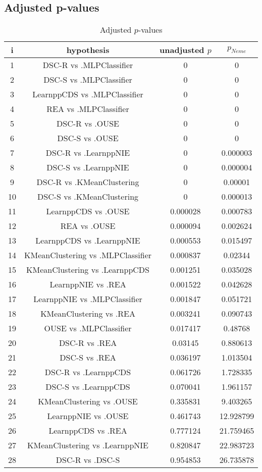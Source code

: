 \documentclass[a4paper,10pt]{article}
\begin{document}
\begin{landscape}
\pagebreak

\subsection{Adjusted p-values}

\begin{table}[!htp]
\centering\scriptsize
\begin{tabular}{cccc}
i&hypothesis&unadjusted $p$&$p_{Neme}$\\
\hline1&DSC-R vs .MLPClassifier&0&0\\
2&DSC-S vs .MLPClassifier&0&0\\
3&LearnppCDS vs .MLPClassifier&0&0\\
4&REA vs .MLPClassifier&0&0\\
5&DSC-R vs .OUSE&0&0\\
6&DSC-S vs .OUSE&0&0\\
7&DSC-R vs .LearnppNIE&0&0.000003\\
8&DSC-S vs .LearnppNIE&0&0.000004\\
9&DSC-R vs .KMeanClustering&0&0.00001\\
10&DSC-S vs .KMeanClustering&0&0.000013\\
11&LearnppCDS vs .OUSE&0.000028&0.000783\\
12&REA vs .OUSE&0.000094&0.002624\\
13&LearnppCDS vs .LearnppNIE&0.000553&0.015497\\
14&KMeanClustering vs .MLPClassifier&0.000837&0.02344\\
15&KMeanClustering vs .LearnppCDS&0.001251&0.035028\\
16&LearnppNIE vs .REA&0.001522&0.042628\\
17&LearnppNIE vs .MLPClassifier&0.001847&0.051721\\
18&KMeanClustering vs .REA&0.003241&0.090743\\
19&OUSE vs .MLPClassifier&0.017417&0.48768\\
20&DSC-R vs .REA&0.03145&0.880613\\
21&DSC-S vs .REA&0.036197&1.013504\\
22&DSC-R vs .LearnppCDS&0.061726&1.728335\\
23&DSC-S vs .LearnppCDS&0.070041&1.961157\\
24&KMeanClustering vs .OUSE&0.335831&9.403265\\
25&LearnppNIE vs .OUSE&0.461743&12.928799\\
26&LearnppCDS vs .REA&0.777124&21.759465\\
27&KMeanClustering vs .LearnppNIE&0.820847&22.983723\\
28&DSC-R vs .DSC-S&0.954853&26.735878\\
\hline
\end{tabular}
\caption{Adjusted $p$-values}
\end{table}

\end{landscape}
\end{document}
